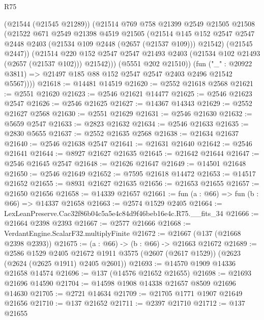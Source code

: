 \begin{lexlean}{R75}
\begin{coremodule}
              (@21544 (@21545 @21289))
              (@21514
                @769
                @758
                @21399
                @2549
                @21505
                @21508
                (@21522
                  @671
                  @2549
                  @21398
                  @4519
                  @21505
                  (@21514
                    @145
                    @152
                    @2547
                    @2547
                    @2448
                    @2403
                    (@21534 @109 @2448 (@2657 (@21537 @109)))
                    @21542)
                  (@21545 @2447))
                (@21514
                  @220
                  @152
                  @2547
                  @2547
                  @21493
                  @2403
                  (@21534 @102 @21493 (@2657 (@21537 @102)))
                  @21542)))
            (@5551 @202 @21510))
          (fun ("_" : @20922 @3811) => @21497 @185 @88 @152 @2547 @2547 @2403 @2496 @21542 @5567))))
@21618 := @14481 @14519
@21620 := @2552 @21618 @2568
@21621 := @2551 @21620
@21623 := @2546 @21621 @14477
@21625 := @2546 @21623 @2547
@21626 := @2546 @21625
@21627 := @14367 @14343
@21629 := @2552 @21627 @2568
@21630 := @2551 @21629
@21631 := @2546 @21630
@21632 := @5659 @2547
@21633 := @2823 @21632
@21634 := @2546 @21633
@21635 := @2830 @5655
@21637 := @2552 @21635 @2568
@21638 := @21634 @21637
@21640 := @2546 @21638 @2547
@21641 := @21631 @21640
@21642 := @2546 @21641
@21644 := @8927 @21627 @21635
@21645 := @21642 @21644
@21647 := @2546 @21645 @2547
@21648 := @21626 @21647
@21649 := @14501 @21648
@21650 := @2546 @21649
@21652 := @7595 @21618 @14472
@21653 := @14517 @21652
@21655 := @8931 @21627 @21635
@21656 := @21653 @21655
@21657 := @21650 @21656
@21658 := @14339 @21657
@21661 := fun (a : @66) => fun (b : @66) => @14337 @21658
@21663 := @2574 @1529 @2405
@21664 := LexLeanPreserve.Cac32f86b04c5a5e4c84d9f46beb16e4c.R75.__fits_34
@21666 := @21664 @2398 @2393
@21667 := @2577 @21666
@21668 := VerdantEngine.ScalarF32.multiplyFinite
@21672 := @21667 (@137 (@21668 @2398 @2393))
@21675 := (a : @66) -> (b : @66) -> @21663 @21672
@21689 := @2586
    @1529
    @2405
    @21672
    @1911
    @3575
    (@2607 (@2617 @1529))
    (@2623 (@2624 (@2625 @1911) @2405 @2601))
@21693 := @14570 @1909 @14336 @21658 @14574
@21696 := @137 (@14576 @21652 @21655)
@21698 := @21693 @21696 @14590
@21704 := @14598 @1908 @14338 @21657 @8509 @21696 @14630
@21705 := @2721 @14634
@21709 := @21705 @1771 @1907 @21649 @21656
@21710 := @137 @21652
@21711 := @2397 @21710
@21712 := @137 @21655

\end{coremodule}
\end{lexlean}
